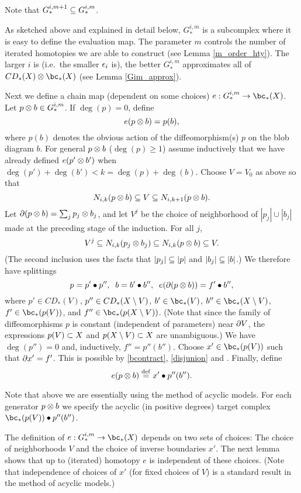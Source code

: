 Note that $G_*^{i,m+1} \subseteq G_*^{i,m}$.

As sketched above and explained in detail below, 
$G_*^{i,m}$ is a subcomplex where it is easy to define
the evaluation map.
The parameter $m$ controls the number of iterated homotopies we are able to construct
(see Lemma \ref{m_order_hty}).
The larger $i$ is (i.e.\ the smaller $\epsilon_i$ is), the better $G_*^{i,m}$ approximates all of
$CD_*(X)\ot \bc_*(X)$ (see Lemma \ref{Gim_approx}).

Next we define a chain map (dependent on some choices) $e: G_*^{i,m} \to \bc_*(X)$.
Let $p\otimes b \in G_*^{i,m}$.
If $\deg(p) = 0$, define
\[
	e(p\otimes b) = p(b) ,
\]
where $p(b)$ denotes the obvious action of the diffeomorphism(s) $p$ on the blob diagram $b$.
For general $p\otimes b$ ($\deg(p) \ge 1$) assume inductively that we have already defined
$e(p'\otimes b')$ when $\deg(p') + \deg(b') < k = \deg(p) + \deg(b)$.
Choose $V = V_0$ as above so that 
\[
	N_{i,k}(p\otimes b) \subseteq V \subseteq N_{i,k+1}(p\otimes b) .
\]
Let $\partial(p\otimes b) = \sum_j p_j\otimes b_j$, and let $V^j$ be the choice of neighborhood
of $|p_j|\cup |b_j|$ made at the preceding stage of the induction.
For all $j$, 
\[
	V^j \subseteq N_{i,k}(p_j\otimes b_j) \subseteq N_{i,k}(p\otimes b) \subseteq V .
\]
(The second inclusion uses the facts that $|p_j| \subseteq |p|$ and $|b_j| \subseteq |b|$.)
We therefore have splittings
\[
	p = p'\bullet p'' , \;\; b = b'\bullet b'' , \;\; e(\partial(p\otimes b)) = f'\bullet b'' ,
\]
where $p' \in CD_*(V)$, $p'' \in CD_*(X\setminus V)$, 
$b' \in \bc_*(V)$, $b'' \in \bc_*(X\setmin V)$, 
$f' \in \bc_*(p(V))$, and $f'' \in \bc_*(p(X\setmin V))$.
(Note that since the family of diffeomorphisms $p$ is constant (independent of parameters)
near $\partial V$, the expressions $p(V) \subset X$ and $p(X\setminus V) \subset X$ are
unambiguous.)
We have $\deg(p'') = 0$ and, inductively, $f'' = p''(b'')$.
Choose $x' \in \bc_*(p(V))$ such that $\partial x' = f'$.
This is possible by \ref{bcontract}, \ref{disjunion} and .
Finally, define
\[
	e(p\otimes b) \stackrel{\mathrm{def}}{=} x' \bullet p''(b'') .
\]

Note that above we are essentially using the method of acyclic models.
For each generator $p\otimes b$ we specify the acyclic (in positive degrees) 
target complex $\bc_*(p(V)) \bullet p''(b'')$.

The definition of $e: G_*^{i,m} \to \bc_*(X)$ depends on two sets of choices:
The choice of neighborhoods $V$ and the choice of inverse boundaries $x'$.
The next lemma shows that up to (iterated) homotopy $e$ is independent
of these choices.
(Note that independence of choices of $x'$ (for fixed choices of $V$)
is a standard result in the method of acyclic models.)

